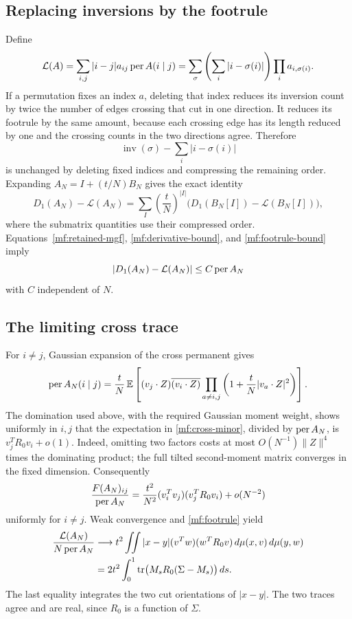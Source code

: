 \subsection{Replacing inversions by the footrule}

Define
\begin{equation}\label{mf:footrule}
 \mathcal L(A)=\sum_{i,j}|i-j|a_{ij}\operatorname{per} A(i\mid j)
 =\sum_\sigma\left(\sum_i|i-\sigma(i)|\right)
                         \prod_i a_{i,\sigma(i)}.
\end{equation}
If a permutation fixes an index \(a\), deleting that index reduces its
inversion count by twice the number of edges crossing that cut in one
direction. It reduces its footrule by the same amount, because each
crossing edge has its length reduced by one and the crossing counts in
the two directions agree. Therefore
\[
 \operatorname{inv}(\sigma)-\sum_i|i-\sigma(i)|
\]
is unchanged by deleting fixed indices and compressing the remaining
order.
Expanding \(A_N=I+(t/N)B_N\) gives the exact identity
\begin{equation}\label{mf:compression}
 D_1(A_N)-\mathcal L(A_N)
 =\sum_I\left(\frac tN\right)^{|I|}
       \bigl(D_1(B_N[I])-\mathcal L(B_N[I])\bigr),
\end{equation}
where the submatrix quantities use their compressed order.
Equations~\eqref{mf:retained-mgf},
\eqref{mf:derivative-bound}, and \eqref{mf:footrule-bound} imply
\begin{equation}\label{mf:bounded-defect}
 |D_1(A_N)-\mathcal L(A_N)|\le C\operatorname{per} A_N
\end{equation}
with \(C\) independent of \(N\).

\subsection{The limiting cross trace}

For \(i\ne j\), Gaussian expansion of the cross permanent gives
\begin{equation}\label{mf:cross-minor}
 \operatorname{per} A_N(i\mid j)=\frac tN\,
 \mathbb E\left[
 (v_j\cdot Z)\overline{(v_i\cdot Z)}
 \prod_{a\ne i,j}\left(1+\frac tN|v_a\cdot Z|^2\right)\right].
\end{equation}
The domination used above, with the required Gaussian moment weight,
shows uniformly in \(i,j\) that the expectation in
\eqref{mf:cross-minor}, divided by \(\operatorname{per} A_N\), is
\(v_j^TR_0v_i+o(1)\).
Indeed, omitting two factors costs at most
\(O(N^{-1})\|Z\|^4\) times the dominating product; the full tilted
second-moment matrix converges in the fixed dimension.
Consequently
\[
 \frac{F(A_N)_{ij}}{\operatorname{per} A_N}
 =\frac{t^2}{N^2}(v_i^Tv_j)(v_j^TR_0v_i)+o(N^{-2})
\]
uniformly for \(i\ne j\). Weak convergence and \eqref{mf:footrule} yield
\begin{align}
 \frac{\mathcal L(A_N)}{N\operatorname{per} A_N}
 &\longrightarrow
 t^2\iint |x-y|(v^Tw)(w^TR_0v)\,d\mu(x,v)\,d\mu(y,w)\notag\\
 &=2t^2\int_0^1\operatorname{tr}
             \bigl(M_sR_0(\Sigma-M_s)\bigr)\,ds.\label{mf:footrule-limit}
\end{align}
The last equality integrates the two cut orientations of \(|x-y|\).
The two traces agree and are real, since \(R_0\) is a function of
\(\Sigma\).

